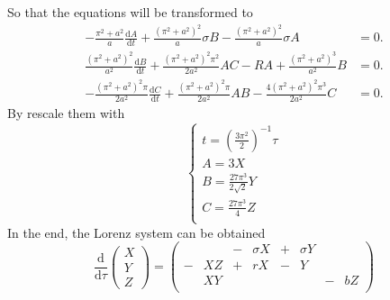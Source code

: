So that the equations will be transformed to
\begin{align*}
	-\frac{\pi^2+a^2}{a}\frac{\mathrm{d}A}{\mathrm{d}t}+\frac{\left(\pi^2+a^2\right)^2}{a}\sigma B-\frac{\left(\pi^2+a^2\right)^2}{a}\sigma A&=0.\\
	\frac{\left(\pi^2+a^2\right)^2}{a^2}\frac{\mathrm{d}B}{\mathrm{d}t}+\frac{\left(\pi^2+a^2\right)^2\pi^2}{2a^2}AC-RA+\frac{\left(\pi^2+a^2\right)^3}{a^2}B&=0.\\
	-\frac{\left(\pi^2+a^2\right)^2\pi}{2a^2}\frac{\mathrm{d}C}{\mathrm{d}t}+\frac{\left(\pi^2+a^2\right)^2\pi}{2a^2}AB-\frac{4\left(\pi^2+a^2\right)^2\pi^3}{2a^2}C&=0.
\end{align*}
By rescale them with
\begin{equation}
	\left\{
		\begin{matrix}
			t=\left(\frac{3\pi^2}{2}\right)^{-1}\tau\\
			A=3X\\
			B=\frac{27\pi^3}{2\sqrt{2}}Y\\
			C=\frac{27\pi^3}{4}Z\\
		\end{matrix}
	\right.
	\label{equ:rescale}
\end{equation}
In the end, the Lorenz system can be obtained
\begin{equation}
	\frac{\mathrm{d}}{\mathrm{d}\tau}
	\begin{pmatrix}
		X\\Y\\Z
	\end{pmatrix}
	=
	\begin{pmatrix}
	&&-&\sigma X&+&\sigma Y&&\\-&XZ&+&rX&-&Y&&\\&XY&&&&&-&bZ\\
	\end{pmatrix}
	\label{equ:lorenz_system}
\end{equation}
\par
